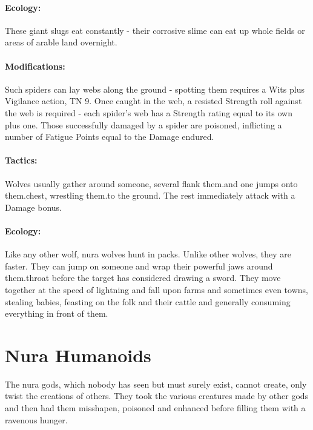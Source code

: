 \paragraph{Ecology:} These giant slugs eat constantly - their corrosive slime can eat up whole fields or areas of arable land overnight.

\label{nura_spider}

\nuraspider

\paragraph{Modifications:} Such spiders can lay webs along the ground - spotting them requires a Wits plus Vigilance action, TN 9.
Once caught in the web, a resisted Strength roll against the web is required - each spider's web has a Strength rating equal to its own plus one.  Those successfully damaged by a spider are poisoned, inflicting a number of Fatigue Points equal to the Damage endured.

\label{nura_wolf}

\nurawolf

\paragraph{Tactics:} Wolves usually gather around someone, several flank them.and one jumps onto them.chest, wrestling them.to the ground.  The rest immediately attack with a Damage bonus.

\paragraph{Ecology:} Like any other wolf, nura wolves hunt in packs.  Unlike other wolves, they are faster.  They can jump on someone and wrap their powerful jaws around them.throat before the target has considered drawing a sword.  They move together at the speed of lightning and fall upon farms and sometimes even towns, stealing babies, feasting on the folk and their cattle and generally consuming everything in front of them.

\section{Nura Humanoids}

The nura gods, which nobody has seen but must surely exist, cannot create, only twist the creations of others.  They took the various creatures made by other gods and then had them misshapen, poisoned and enhanced before filling them with a ravenous hunger.

